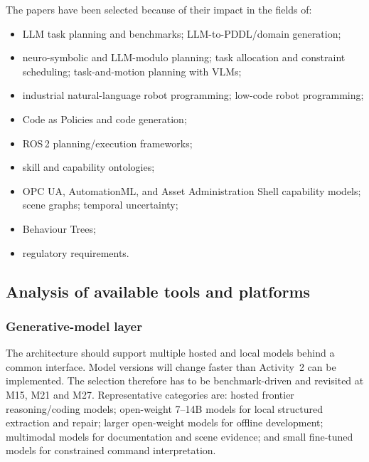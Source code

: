 \documentclass{plan4ari_report}
\begin{document}
The papers have been selected because of their impact in the fields of:
\begin{itemize}
\item LLM task planning and benchmarks; LLM-to-PDDL/domain generation;
\item neuro-symbolic and LLM-modulo planning; task allocation and constraint scheduling; task-and-motion planning with VLMs;
\item industrial natural-language robot programming; low-code robot programming;
\item Code as Policies and code generation;
\item ROS\,2 planning/execution frameworks;
\item skill and capability ontologies;
\item OPC UA, AutomationML, and Asset Administration Shell capability models; scene graphs; temporal uncertainty;
\item Behaviour Trees;
\item regulatory requirements.
\end{itemize}

\subsection{Analysis of available tools and platforms}

\subsubsection{Generative-model layer}
The architecture should support multiple hosted and local models behind a common interface. Model versions will change faster than Activity~2 can be implemented. The selection therefore has to be benchmark-driven and revisited at M15, M21 and M27. Representative categories are: hosted frontier reasoning/coding models; open-weight 7--14B models for local structured extraction and repair; larger open-weight models for offline development; multimodal models for documentation and scene evidence; and small fine-tuned models for constrained command interpretation.
\end{document}
